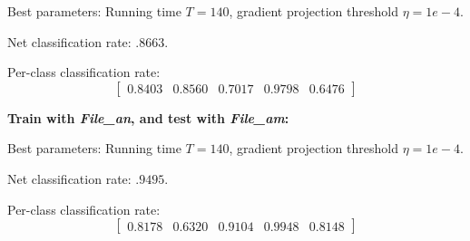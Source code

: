 \documentclass[letterpaper]{article}
\begin{document}
Best parameters: Running time $T=140$, gradient projection threshold $\eta=1e-4$.

Net classification rate: $.8663$.

Per-class classification rate: 
$$\begin{bmatrix} 0.8403  &  0.8560   & 0.7017 &   0.9798  &  0.6476\end{bmatrix}$$

\textbf{Train with \textit{File\_an}, and test with \textit{File\_am}:}

Best parameters: Running time $T=140$, gradient projection threshold $\eta=1e-4$.

Net classification rate: $.9495$.

Per-class classification rate: 
$$\begin{bmatrix}0.8178 &   0.6320 &   0.9104  &  0.9948  &  0.8148\end{bmatrix}$$
\end{document}
